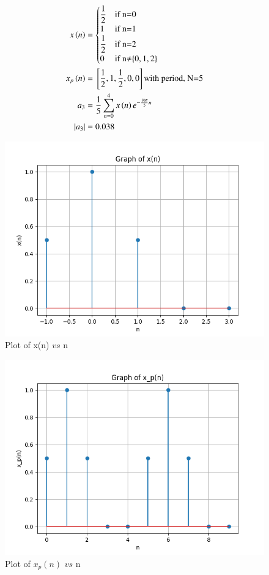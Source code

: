 \documentclass[journal,12pt,twocolumn]{IEEEtran}
\theoremstyle{remark}
\begin{document}
\begin{align}
    x\left(n\right)&=
    \begin{cases}
        \dfrac{1}{2} & \text{if n=0}\\
        1 & \text{if n=1}\\
        \dfrac{1}{2} & \text{if n=2}\\
        0 & \text{if n$\neq$\ensuremath{\left\{0,1,2\right\}} }
    \end{cases}\\
    x_{p}\left(n\right)&={}\left[\frac{1}{2},1,\frac{1}{2},0,0\right] \text{with period, N=5}\\
    a_3&=\frac{1}{5}\sum^{4}_{n=0}x\left(n\right)e^{-\frac{j6\pi}{5}n}\\
    |a_3|&=0.038
\end{align}
\begin{figure}[ht]
    \centering
    \includegraphics[width=\columnwidth]{figs/Figure_1.png}
    \caption{Plot of x(n) $vs$ n}
    \label{fig:50.1}
\end{figure}
\begin{figure}[ht]
    \centering
    \includegraphics[width=\columnwidth]{figs/Figure_2.png}
    \caption{Plot of $x_p(n)$ $vs$ n}
    \label{fig:50.2}
\end{figure}
\end{document}
